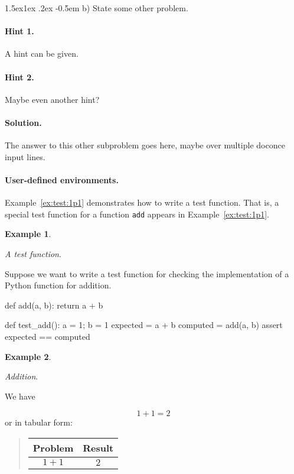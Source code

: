 \documentclass[%
oneside,                 %
final,                   %
10pt]{article}
\makeatletter
\newenvironment{doconceexercise}{}{}
\newcommand\subex{\@startsection{paragraph}{4}{\z@}%
                  {1.5ex\@plus1ex \@minus.2ex}%
                  {-0.5em}%
                  {\normalfont\normalsize\bfseries}}
\theoremstyle{definition}
\newtheorem{example}{Example}[section]
\makeatother
\begin{document}
\begin{enumerate}
\begin{doconceexercise}
\subex{b)}
State some other problem.

\paragraph{Hint 1.}
A hint can be given.

\paragraph{Hint 2.}
Maybe even another hint?

\paragraph{Solution.}
The answer to this other subproblem goes here,
maybe over multiple doconce input lines.

\end{doconceexercise}

\paragraph{User-defined environments.}
Example~\vref{ex:test:1p1} demonstrates how to write a test function.
That is, a special test function for a function \texttt{add} appears in
Example~\vref{ex:test:1p1}.

\begin{example}
\label{ex:test:1p1}

\noindent\emph{A test function}.

Suppose we want to write a test function for checking the
implementation of a Python function for addition.

\bpycod
def add(a, b):
    return a + b

def test_add():
    a = 1; b = 1
    expected = a + b
    computed = add(a, b)
    assert expected == computed
\epycod
\end{example}

\begin{example}
\label{ex:math:1p1}

\noindent\emph{Addition}.

We have

\[ 1 + 1 = 2 \]
or in tabular form:


\begin{quote}
\begin{tabular}{cc}
\hline
\multicolumn{1}{c}{ Problem } & \multicolumn{1}{c}{ Result } \\
\hline
$1+1$   & $2$    \\
\hline
\end{tabular}
\end{quote}


\end{example}
\end{enumerate}
\end{document}
